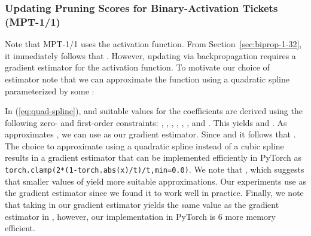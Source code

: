 \documentclass{article} \usepackage{iclr2021_conference,times}
\begin{document}
\iffalse
\begin{algorithm}[t!]
\begin{algorithmic} 
\STATE{\textbf{Input}: Neural network  with 1- or 32-bit activations; Pruning percentage ; Loss function ; Training features/labels .}
\STATE{\textit{Randomly Initialize Parameters}:
Network weights ; Pruning scores .}
\STATE{\textit{Init. MPT Parameters}:
Pruning mask ; Binary subnetwork weights ; Gain term .}
\FOR{ to }
    \STATE{ \hfill Update pruning scores} \vspace{1mm}
    \STATE{ Sorting of indices  s.t.  \hfill Nondecreasing sort of } \vspace{1mm}
    \STATE{ \hfill Update pruning mask components} \vspace{1mm}
    \STATE{ \hfill Update binary subnetwork weights} \vspace{1mm}
    \STATE{ \hfill Update gain term} \vspace{1mm}
\ENDFOR
\STATE{\textbf{Output}: Return Binarized Subnetwork .}
\end{algorithmic}
\caption{\textbf{biprop}: Finding multi-prize tickets in a randomly weighted neural network}
\label{alg:quant-opt}
\end{algorithm}
\fi



\subsubsection{Updating Pruning Scores for Binary-Activation Tickets (MPT-1/1)} \label{sec:biprop-1-1}
Note that MPT-1/1 uses the  activation function. From Section~\ref{sec:biprop-1-32}, it immediately follows that . However, updating  via backpropagation requires a gradient estimator for the  activation function. To motivate our choice of estimator note that we can approximate the  function using a quadratic spline parameterized by some :  

In (\ref{eq:quad-spline}),  and suitable values for the coefficients are derived using the following zero- and first-order constraints: , , , , , , and . This yields  and . As  approximates , we can use  as our gradient estimator. Since  and  it follows that . The choice to approximate  using a quadratic spline instead of a cubic spline results in a gradient estimator that can be implemented efficiently in PyTorch as \texttt{torch.clamp(2*(1-torch.abs(x)/t)/t,min=0.0)}. We note that , which suggests that smaller values of  yield more suitable approximations. Our experiments use  as the gradient estimator since we found it to work well in practice. Finally, we note that taking  in our gradient estimator yields the same value as the gradient estimator in \citep{liu2018bi}, however, our implementation in PyTorch is 6 more memory efficient. 
\end{document}
